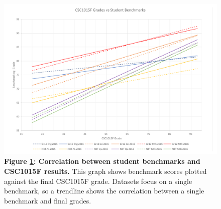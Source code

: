 \begin{figure}[H]
    \centering
    \begin{mdframed}
        \centering
        \includegraphics[scale=0.55]{./resources/figures/run1-chart1.png}
    \end{mdframed}
    \caption[CSC1015 grade vs benchmark correlation]{\textbf{Figure \ref{run1-chart1}: Correlation between student benchmarks and CSC1015F results.} This graph shows benchmark scores plotted against the final CSC1015F grade. Datasets focus on a single benchmark, so a trendline shows the correlation between a single benchmark and final grades.}
    \label{run1-chart1}
\end{figure}